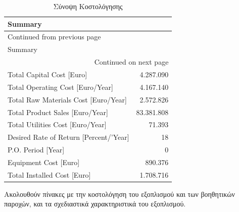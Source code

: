 \documentclass[11pt]{article}
\begin{document}
\begin{longtable}{lr}
\caption{Σύνοψη Κοστολόγησης}
\\
Summary & \\
\hline
\endfirsthead
\multicolumn{2}{l}{Continued from previous page} \\
\hline

Summary &  \\

\hline
\endhead
\hline\multicolumn{2}{r}{Continued on next page} \\
\endfoot
\endlastfoot
\hline
Total Capital Cost [Euro] & 4.287.090\\
Total Operating Cost [Euro/Year] & 4.167.140\\
Total Raw Materials Cost [Euro/Year] & 2.572.826\\
Total Product Sales [Euro/Year] & 83.381.808\\
Total Utilities Cost [Euro/Year] & 71.393\\
Desired Rate of Return [Percent/'Year] & 18\\
P.O. Period [Year] & 0\\
Equipment Cost [Euro] & 890.376\\
Total Installed Cost [Euro] & 1.708.716\\
\end{longtable}

Ακολουθούν πίνακες με την κοστολόγηση του εξοπλισμού και των βοηθητικών
παροχών, και τα σχεδιαστικά χαρακτηριστικά του εξοπλισμού.
\end{document}
